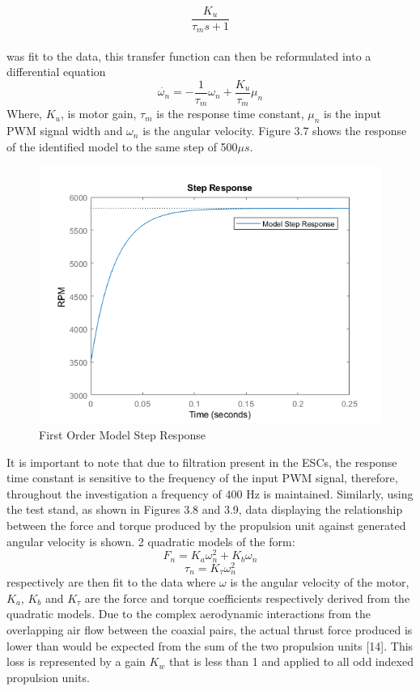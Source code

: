 \documentclass[12pt,a4paper,twoside]{report}
\begin{document}
			\\
			\[ \frac{K_u}{\tau_m s + 1} \]
			\\
			was fit to the data, this transfer function can then be reformulated into a differential equation
			\begin{equation}
				\dot{\omega_n} = -\frac{1}{\tau_m}\omega_n	 + \frac{K_u}{\tau_m}\mu_n
			\end{equation}
			Where, $K_u$, is motor gain, $\tau_m$ is the response time constant, $\mu_n$ is the input PWM signal width and $\omega_n$ is the angular velocity. Figure 3.7 shows the response of the identified model to the same step of 500$\mu s$.
			
			\begin{figure}[h!]
				\centering
				\includegraphics[width=0.7\linewidth]{ModelStep.png}
				\caption{First Order Model Step Response}
				\label{fig:modelstep}
			\end{figure}
			
			It is important to note that due to filtration present in the ESCs, the response time constant is sensitive to the frequency of the input PWM signal, therefore, throughout the investigation a frequency of 400 Hz is maintained. Similarly, using the test stand, as shown in Figures 3.8 and 3.9, data displaying the relationship between the force and torque produced by the propulsion unit against generated angular velocity is shown. 2 quadratic models of the form: 
			\begin{equation}
				F_n = K_a \omega_n^2 + K_b\omega_n
			\end{equation}
			\begin{equation}
				\tau_n = K_\tau \omega_n^2
			\end{equation}
			respectively are then fit to the data where $\omega$ is the angular velocity of the motor, $K_a$, $K_b$ and $K_\tau$ are the force and torque coefficients respectively derived from the quadratic models. Due to the complex aerodynamic interactions from the overlapping air flow between the coaxial pairs, the actual thrust force produced is lower than would be expected from the sum of the two propulsion units [14]. This loss is represented by a gain $K_w$ that is less than 1 and applied to all odd indexed propulsion units.	
			
\end{document}
